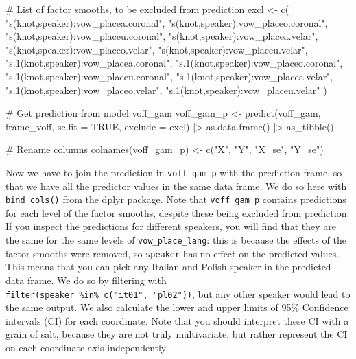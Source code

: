 \documentclass[
  man,
  longtable,
  nolmodern,
  notxfonts,
  notimes,
  colorlinks=true,linkcolor=blue,citecolor=blue,urlcolor=blue]{apa7}
\newenvironment{Shaded}{\begin{snugshade}}{\end{snugshade}}
\newcommand{\AttributeTok}[1]{\textcolor[rgb]{0.40,0.45,0.13}{#1}}
\newcommand{\CommentTok}[1]{\textcolor[rgb]{0.37,0.37,0.37}{#1}}
\newcommand{\ConstantTok}[1]{\textcolor[rgb]{0.56,0.35,0.01}{#1}}
\newcommand{\FunctionTok}[1]{\textcolor[rgb]{0.28,0.35,0.67}{#1}}
\newcommand{\NormalTok}[1]{\textcolor[rgb]{0.00,0.23,0.31}{#1}}
\newcommand{\OtherTok}[1]{\textcolor[rgb]{0.00,0.23,0.31}{#1}}
\newcommand{\SpecialCharTok}[1]{\textcolor[rgb]{0.37,0.37,0.37}{#1}}
\newcommand{\StringTok}[1]{\textcolor[rgb]{0.13,0.47,0.30}{#1}}
\begin{document}
\begin{Shaded}
\begin{Highlighting}[]
\CommentTok{\# List of factor smooths, to be excluded from prediction}
\NormalTok{excl }\OtherTok{\textless{}{-}} \FunctionTok{c}\NormalTok{(}
  \StringTok{"s(knot,speaker):vow\_placea.coronal"}\NormalTok{,}
  \StringTok{"s(knot,speaker):vow\_placeo.coronal"}\NormalTok{,}
  \StringTok{"s(knot,speaker):vow\_placeu.coronal"}\NormalTok{,}
  \StringTok{"s(knot,speaker):vow\_placea.velar"}\NormalTok{,}
  \StringTok{"s(knot,speaker):vow\_placeo.velar"}\NormalTok{,}
  \StringTok{"s(knot,speaker):vow\_placeu.velar"}\NormalTok{,}
  \StringTok{"s.1(knot,speaker):vow\_placea.coronal"}\NormalTok{,}
  \StringTok{"s.1(knot,speaker):vow\_placeo.coronal"}\NormalTok{,}
  \StringTok{"s.1(knot,speaker):vow\_placeu.coronal"}\NormalTok{,}
  \StringTok{"s.1(knot,speaker):vow\_placea.velar"}\NormalTok{,}
  \StringTok{"s.1(knot,speaker):vow\_placeo.velar"}\NormalTok{,}
  \StringTok{"s.1(knot,speaker):vow\_placeu.velar"}
\NormalTok{)}

\CommentTok{\# Get prediction from model voff\_gam}
\NormalTok{voff\_gam\_p }\OtherTok{\textless{}{-}} \FunctionTok{predict}\NormalTok{(voff\_gam, frame\_voff, }\AttributeTok{se.fit =} \ConstantTok{TRUE}\NormalTok{, }\AttributeTok{exclude =}\NormalTok{ excl) }\SpecialCharTok{|\textgreater{}}
  \FunctionTok{as.data.frame}\NormalTok{() }\SpecialCharTok{|\textgreater{}}
  \FunctionTok{as\_tibble}\NormalTok{()}

\CommentTok{\# Rename columns}
\FunctionTok{colnames}\NormalTok{(voff\_gam\_p) }\OtherTok{\textless{}{-}} \FunctionTok{c}\NormalTok{(}\StringTok{"X"}\NormalTok{, }\StringTok{"Y"}\NormalTok{, }\StringTok{"X\_se"}\NormalTok{, }\StringTok{"Y\_se"}\NormalTok{)}
\end{Highlighting}
\end{Shaded}

Now we have to join the prediction in \texttt{voff\_gam\_p} with the
prediction frame, so that we have all the predictor values in the same
data frame. We do so here with \texttt{bind\_cols()} from the dplyr
package. Note that \texttt{voff\_gam\_p} contains predictions for each
level of the factor smooths, despite these being excluded from
prediction. If you inspect the predictions for different speakers, you
will find that they are the same for the same levels of
\texttt{vow\_place\_lang}: this is because the effects of the factor
smooths were removed, so \texttt{speaker} has no effect on the predicted
values. This means that you can pick any Italian and Polish speaker in
the predicted data frame. We do so by filtering with
\texttt{filter(speaker\ \%in\%\ c("it01",\ "pl02"))}, but any other
speaker would lead to the same output. We also calculate the lower and
upper limits of 95\% Confidence intervals (CI) for each coordinate. Note
that you should interpret these CI with a grain of salt, because they
are not truly multivariate, but rather represent the CI on each
coordinate axis independently.
\end{document}
